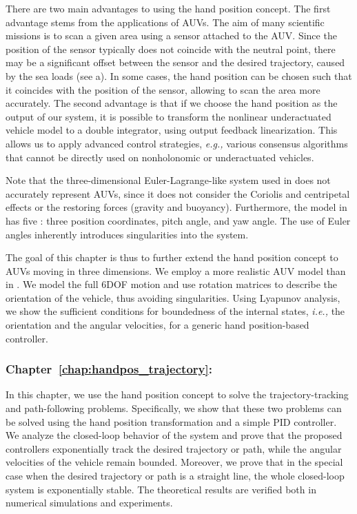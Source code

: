 There are two main advantages to using the hand position concept.
The first advantage stems from the applications of AUVs.
The aim of many scientific missions is to scan a given area using a sensor attached to the AUV.
Since the position of the sensor typically does not coincide with the neutral point, there may be a significant offset between the sensor and the desired trajectory, caused by the sea loads (see a).
In some cases, the hand position can be chosen such that it coincides with the position of the sensor, allowing to scan the area more accurately.
The second advantage is that if we choose the hand position as the output of our system, it is possible to transform the nonlinear underactuated vehicle model to a double integrator, using output feedback linearization.
This allows us to apply advanced control strategies, \emph{e.g.,} various consensus algorithms \cite{cai_hand-position-rigidity-planar_2015,li_hand-position-rigidity-3d_2021,lawton_hand-position-formation_2003,restrepo_formation_2022} that cannot be directly used on nonholonomic or underactuated vehicles.

Note that the three-dimensional Euler-Lagrange-like system used in \cite{li_hand-position-rigidity-3d_2021} does not accurately represent AUVs, since it does not consider the Coriolis and centripetal effects or the restoring forces (gravity and buoyancy).
Furthermore, the model in \cite{li_hand-position-rigidity-3d_2021} has five : three position coordinates, pitch angle, and yaw angle.
The use of Euler angles inherently introduces singularities into the system.

The goal of this chapter is thus to further extend the hand position concept to AUVs moving in three dimensions.
We employ a more realistic AUV model than in \cite{li_hand-position-rigidity-3d_2021}. We model the full 6DOF motion and use rotation matrices to describe the orientation of the vehicle, thus avoiding singularities.
Using Lyapunov analysis, we show the sufficient conditions for boundedness of the internal states, \emph{i.e.,} the orientation and the angular velocities, for a generic hand position-based controller.

\subsubsection{Chapter~\ref{chap:handpos_trajectory}: }

In this chapter, we use the hand position concept to solve the trajectory-tracking and path-following problems.
Specifically, we show that these two problems can be solved using the hand position transformation and a simple PID controller.
We analyze the closed-loop behavior of the system and prove that the proposed controllers exponentially track the desired trajectory or path, while the angular velocities of the vehicle remain bounded.
Moreover, we prove that in the special case when the desired trajectory or path is a straight line, the whole closed-loop system is exponentially stable.
The theoretical results are verified both in numerical simulations and experiments.

